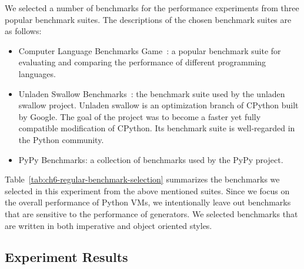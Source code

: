 We selected a number of benchmarks for the performance experiments from three popular benchmark suites.
The descriptions of the chosen benchmark suites are as follows:

\begin{itemize}

\item Computer Language Benchmarks Game~\cite{benchmarkgame}: a popular benchmark suite for evaluating and comparing the performance of different programming languages.

\item Unladen Swallow Benchmarks~\cite{unladen.swallow}: the benchmark suite used by the unladen swallow project.
Unladen swallow is an optimization branch of CPython built by Google.
The goal of the project was to become a faster yet fully compatible modification of CPython.
Its benchmark suite is well-regarded in the Python community.

\item PyPy Benchmarks: a collection of benchmarks used by the PyPy project.

\end{itemize}

Table~\ref{tab:ch6-regular-benchmark-selection} summarizes the benchmarks we selected in this experiment from the above mentioned suites.
Since we focus on the overall performance of Python VMs, we intentionally leave out benchmarks that are sensitive to the performance of generators.
We selected benchmarks that are written in both imperative and object oriented styles.

\subsection{Experiment Results}

